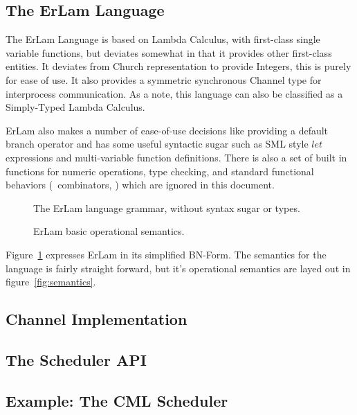 \subsection{The ErLam Language}\label{sec:the erlam language}

The ErLam Language is based on Lambda Calculus, with first-class single 
variable functions, but deviates somewhat in that it provides other first-class 
entities. It deviates from Church representation to provide Integers, this is
purely for ease of use. It also provides a symmetric synchronous Channel type 
for interprocess communication. As a note, this language can also be classified 
as a Simply-Typed Lambda Calculus.

ErLam also makes a number of ease-of-use decisions like providing a default 
branch operator and has some useful syntactic sugar such as SML style $let$ 
expressions and multi-variable function definitions. There is also a set of
built in functions for numeric operations, type checking, and standard 
functional behaviors (\eg~combinators, \etc) which are ignored in this 
document.

\begin{figure} %
\centering

\caption{The ErLam language grammar, without syntax sugar or types.}
\label{fig:grammer}
\end{figure}

\begin{figure}
\centering

\caption{ErLam basic operational semantics.}
\label{sec:semantics}
\end{figure}


Figure~\ref{fig:grammer} expresses ErLam in its simplified BN-Form. The 
semantics for the language is fairly straight forward, but it's operational 
semantics are layed out in figure~\ref{fig:semantics}. 

\subsection{Channel Implementation}\label{sec:channel implementation}
\subsection{The Scheduler API}\label{sec:the scheduler api}
\subsection{Example: The CML Scheduler}\label{sec:example the cml scheduler}


